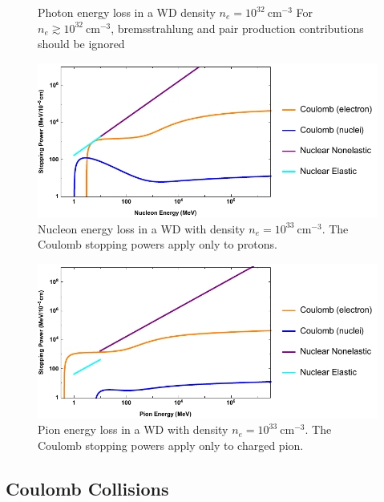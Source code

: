 \documentclass[twocolumn,showpacs,preprintnumbers,amsmath,amssymb,prd]{revtex4}
\begin{document}
\begin{appendices}
\begin{figure}
\caption{Photon energy loss in a WD density $n_e = 10^{32} ~\text{cm}^{-3}$ For $n_e \gtrsim 10^{32} ~\text{cm}^{-3}$, bremsstrahlung and pair production contributions should be ignored}
\label{fig:SPphoton}
\end{figure}
\begin{figure}
\includegraphics[scale=.45]{SPnucleon.pdf}
\caption{Nucleon energy loss in a WD with density $n_e = 10^{33} ~\text{cm}^{-3}$. The Coulomb stopping powers apply only to protons.}
\label{fig:SPnuc}
\end{figure}
\begin{figure}
\includegraphics[scale=.45]{SPpion.pdf}
\caption{Pion energy loss in a WD with density $n_e = 10^{33} ~\text{cm}^{-3}$. The Coulomb stopping powers apply only to charged pion.}
\label{fig:SPpion}
\end{figure}

\subsection*{Coulomb Collisions}


\end{appendices}
\end{document}
